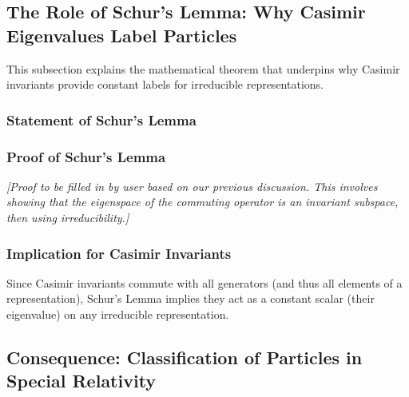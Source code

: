 \documentclass{amsart}
\theoremstyle{definition}
\theoremstyle{remark}
\begin{document}
\subsection{The Role of Schur's Lemma: Why Casimir Eigenvalues Label Particles}
\label{subsec:schurs_lemma_role}
This subsection explains the mathematical theorem that underpins why Casimir invariants provide constant labels for irreducible representations.

\subsubsection{Statement of Schur's Lemma}
\label{subsubsec:schurs_lemma_statement}

\subsubsection{Proof of Schur's Lemma}
\label{subsubsec:schurs_lemma_proof}
\textit{[Proof to be filled in by user based on our previous discussion. This involves showing that the eigenspace of the commuting operator is an invariant subspace, then using irreducibility.]}

\subsubsection{Implication for Casimir Invariants}
\label{subsubsec:schur_implication_casimir}
Since Casimir invariants commute with all generators (and thus all elements of a representation), Schur's Lemma implies they act as a constant scalar (their eigenvalue) on any irreducible representation.

\subsection{Consequence: Classification of Particles in Special Relativity}
\label{subsec:particle_classification_sr}
\end{document}
